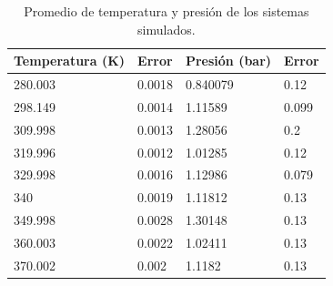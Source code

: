 \begin{table}[h!]
    \centering
    \begin{tabular}{ |m{6em}|m{5em}||m{5em}|m{5em}|  }
    \hline
    Temperatura (K) & Error & Presión (bar) & Error \\
    \hline
    \hline
    280.003 & 0.0018 & 0.840079 & 0.12 \\
    298.149 & 0.0014 & 1.11589 & 0.099 \\
    309.998 & 0.0013 & 1.28056 & 0.2 \\
    319.996 & 0.0012 & 1.01285 & 0.12 \\
    329.998 & 0.0016 & 1.12986 & 0.079 \\
    340 & 0.0019 & 1.11812 & 0.13 \\
    349.998 & 0.0028 & 1.30148 & 0.13 \\
    360.003 & 0.0022 & 1.02411 & 0.13 \\
    370.002 & 0.002 & 1.1182 & 0.13 \\
    \hline
    \end{tabular}
    \caption{Promedio de temperatura y presión de los sistemas simulados.}
    \label{tab:promediostemppres}
\end{table}





